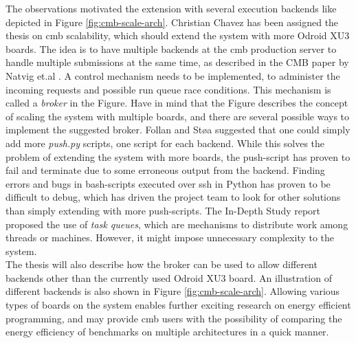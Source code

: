 The observations motivated the extension with several execution backends like depicted in Figure \ref{fig:cmb-scale-arch}. Christian Chavez has been assigned the thesis on \gls{cmb} scalability, which should extend the system with more Odroid XU3 boards. The idea is to have multiple backends at the \gls{cmb} production server to handle multiple submissions at the same time, as described in the CMB paper by Natvig et.al \cite{a:CMB}. A control mechanism needs to be implemented, to administer the incoming requests and possible run queue race conditions. This mechanism is called a \textit{broker} in the Figure. Have in mind that the Figure describes the concept of scaling the system with multiple boards, and there are several possible ways to implement the suggested broker. Follan and Støa suggested that one could simply add more \textit{push.py} scripts, one script for each backend. While this solves the problem of extending the system with more boards, the push-script has proven to fail and terminate due to some erroneous output from the backend. Finding errors and bugs in bash-scripts executed over \gls{ssh} in Python has proven to be difficult to debug, which has driven the project team to look for other solutions than simply extending with more push-scripts. The In-Depth Study report proposed the use of \textit{task queues}, which are mechanisms to distribute work among threads or machines. However, it might impose unnecessary complexity to the system.  \\

The thesis will also describe how the broker can be used to allow different backends other than the currently used Odroid XU3 board. An illustration of different backends is also shown in Figure \ref{fig:cmb-scale-arch}. Allowing various types of boards on the system enables further exciting research on energy efficient programming, and may provide \gls{cmb} users with the possibility of comparing the energy efficiency of benchmarks on multiple architectures in a quick manner.

